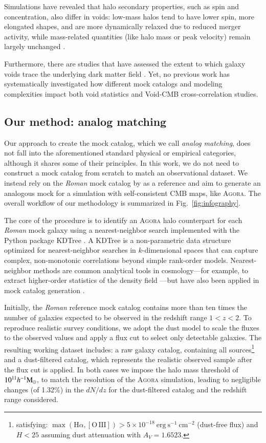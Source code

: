 \documentclass[]{aa} %
\begin{document}
Simulations have revealed that halo secondary properties, such as spin and concentration, also differ in voids: low-mass halos tend to have lower spin, more elongated shapes, and are more dynamically relaxed due to reduced merger activity, while mass-related quantities (like halo mass or peak velocity) remain largely unchanged \citep{balaguera2024}. 

Furthermore, there are studies that have assessed the extent to which galaxy voids trace the underlying dark matter field \citep{sutter2013}. Yet, no previous work has systematically investigated how different mock catalogs and modeling complexities impact both void statistics and Void-CMB cross-correlation studies. 

\subsection{Our method: analog matching}

Our approach to create the mock catalog, which we call \emph{analog matching}, does not fall into the aforementioned standard physical or empirical categories, although it shares some of their principles. In this work, we do not need to construct a mock catalog from scratch to match an observational dataset. We instead rely on the \emph{Roman} mock catalog by \cite{zhai2021clustering} as a reference and aim to generate an analogous mock for a simulation with self-consistent CMB maps, like \textsc{Agora}. The overall workflow of our methodology is summarized in Fig.~\ref{fig:infography}.

The core of the procedure is to identify an \textsc{Agora} halo counterpart for each \emph{Roman} mock galaxy using a nearest-neighbor search implemented with the Python package KDTree \citep{2020SciPy-NMeth}. A KDTree is a non-parametric data structure optimized for nearest-neighbor searches in $k$-dimensional spaces that can capture complex, non-monotonic correlations beyond simple rank-order models. Nearest-neighbor methods are common analytical tools in cosmology---for example, to extract higher-order statistics of the density field \citep{banerjee2021}---but have also been applied in mock catalog generation \citep{hearin2020generating,wechsler2022addgals}.

Initially, the \emph{Roman} reference mock catalog contains more than ten times the number of galaxies expected to be observed in the redshift range $1<z<2$. To reproduce realistic survey conditions, we adopt the \cite{Calzetti2000} dust model to scale the  fluxes to the observed values and apply a flux cut to select only detectable galaxies. The resulting working dataset includes: a raw galaxy catalog, containing all sources\footnote{satisfying: $\max(\mathrm{H}\alpha, [\mathrm{O\,III}]) > 5\times10^{-18}\ \mathrm{erg\ s^{-1}\ cm^{-2}}$ (dust-free flux) and $H < 25$ assuming dust attenuation with $A_V = 1.6523$.} and a dust-filtered catalog, which represents the realistic observed sample after the flux cut is applied. In both cases we impose the halo mass threshold of $10^{11} h^{-1}\rm{M}_\odot$, to match the resolution of the \textsc{Agora} simulation, leading to negligible changes (of 1.32$\%$) in the $dN/dz$ for the dust-filtered catalog and the redshift range considered. 
\end{document}
